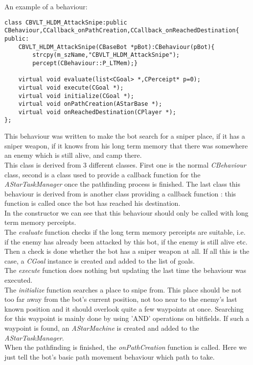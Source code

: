 \documentclass[12pt]{article}
\begin{document}
An example of a behaviour:
\linespread{1.0}
\scriptsize
\begin{verbatim}
class CBVLT_HLDM_AttackSnipe:public CBehaviour,CCallback_onPathCreation,CCallback_onReachedDestination{
public:
    CBVLT_HLDM_AttackSnipe(CBaseBot *pBot):CBehaviour(pBot){
        strcpy(m_szName,"CBVLT_HLDM_AttackSnipe");
        percept(CBehaviour::P_LTMem);}

    virtual void evaluate(list<CGoal> *,CPerceipt* p=0);
    virtual void execute(CGoal *);
    virtual void initialize(CGoal *);
    virtual void onPathCreation(AStarBase *);
    virtual void onReachedDestination(CPlayer *);
};
\end{verbatim}
\linespread{1.3}
\normalsize

This behaviour was written to make the bot search for a sniper place, if it has a sniper weapon, if it knows from his long term memory that there was somewhere an enemy which is still alive, and camp there.\\
This class is derived from 3 different classes. First one is the normal \textit{CBehaviour} class, second is a class used to provide a callback function for the \textit{AStarTaskManager} once the pathfinding process is finished. The last class this behaviour is derived from is another class providing a callback function : this function is called once the bot has reached his destination.\\
In the constructor we can see that this behaviour should only be called with long term memory perceipts.\\
The \textit{evaluate} function checks if the long term memory perceipts are suitable, i.e. if the enemy has already been attacked by this bot, if the enemy is still alive etc. Then a check is done whether the bot has a sniper weapon at all. If all this is the case, a \textit{CGoal} instance is created and added to the list of goals.\\
The \textit{execute} function does nothing but updating the last time the behaviour was executed.\\
The \textit{initialize} function searches a place to snipe from. This place should be not too far away from the bot's current position, not too near to the enemy's last known position and it should overlook quite a few waypoints at once. Searching for this waypoint is mainly done by using 'AND' operations on bitfields. If such a waypoint is found, an \textit{AStarMachine} is created and added to the \textit{AStarTaskManager}.\\
When the pathfinding is finished, the \textit{onPathCreation} function is called. Here we just tell the bot's basic path movement behaviour which path to take.\\
\end{document}
